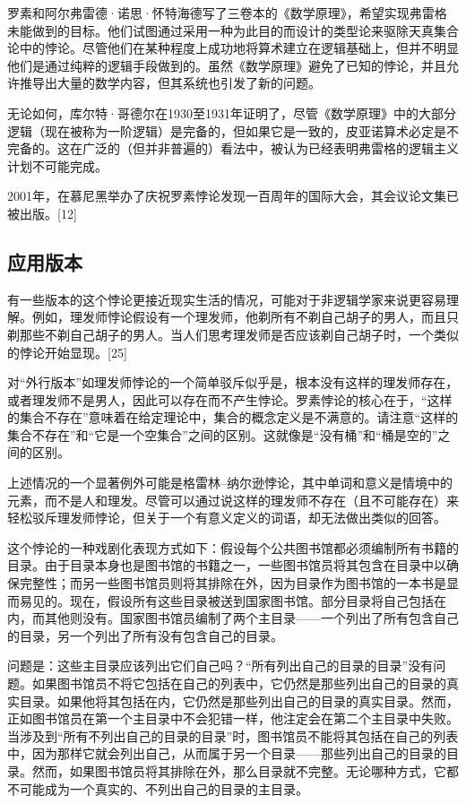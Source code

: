 罗素和阿尔弗雷德·诺思·怀特海德写了三卷本的《数学原理》，希望实现弗雷格未能做到的目标。他们试图通过采用一种为此目的而设计的类型论来驱除天真集合论中的悖论。尽管他们在某种程度上成功地将算术建立在逻辑基础上，但并不明显他们是通过纯粹的逻辑手段做到的。虽然《数学原理》避免了已知的悖论，并且允许推导出大量的数学内容，但其系统也引发了新的问题。

无论如何，库尔特·哥德尔在1930至1931年证明了，尽管《数学原理》中的大部分逻辑（现在被称为一阶逻辑）是完备的，但如果它是一致的，皮亚诺算术必定是不完备的。这在广泛的（但并非普遍的）看法中，被认为已经表明弗雷格的逻辑主义计划不可能完成。

2001年，在慕尼黑举办了庆祝罗素悖论发现一百周年的国际大会，其会议论文集已被出版。[12]
\subsection{应用版本}
有一些版本的这个悖论更接近现实生活的情况，可能对于非逻辑学家来说更容易理解。例如，理发师悖论假设有一个理发师，他剃所有不剃自己胡子的男人，而且只剃那些不剃自己胡子的男人。当人们思考理发师是否应该剃自己胡子时，一个类似的悖论开始显现。[25]

对“外行版本”如理发师悖论的一个简单驳斥似乎是，根本没有这样的理发师存在，或者理发师不是男人，因此可以存在而不产生悖论。罗素悖论的核心在于，“这样的集合不存在”意味着在给定理论中，集合的概念定义是不满意的。请注意“这样的集合不存在”和“它是一个空集合”之间的区别。这就像是“没有桶”和“桶是空的”之间的区别。

上述情况的一个显著例外可能是格雷林–纳尔逊悖论，其中单词和意义是情境中的元素，而不是人和理发。尽管可以通过说这样的理发师不存在（且不可能存在）来轻松驳斥理发师悖论，但关于一个有意义定义的词语，却无法做出类似的回答。

这个悖论的一种戏剧化表现方式如下：假设每个公共图书馆都必须编制所有书籍的目录。由于目录本身也是图书馆的书籍之一，一些图书馆员将其包含在目录中以确保完整性；而另一些图书馆员则将其排除在外，因为目录作为图书馆的一本书是显而易见的。现在，假设所有这些目录被送到国家图书馆。部分目录将自己包括在内，而其他则没有。国家图书馆员编制了两个主目录——一个列出了所有包含自己的目录，另一个列出了所有没有包含自己的目录。

问题是：这些主目录应该列出它们自己吗？“所有列出自己的目录的目录”没有问题。如果图书馆员不将它包括在自己的列表中，它仍然是那些列出自己的目录的真实目录。如果他将其包括在内，它仍然是那些列出自己的目录的真实目录。然而，正如图书馆员在第一个主目录中不会犯错一样，他注定会在第二个主目录中失败。当涉及到“所有不列出自己的目录的目录”时，图书馆员不能将其包括在自己的列表中，因为那样它就会列出自己，从而属于另一个目录——那些列出自己的目录的目录。然而，如果图书馆员将其排除在外，那么目录就不完整。无论哪种方式，它都不可能成为一个真实的、不列出自己的目录的主目录。

